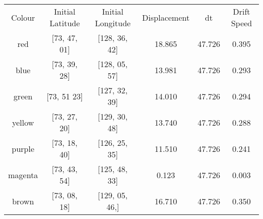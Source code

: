 \begin{tabular}{c|c c c c c}
    Colour & Initial Latitude & Initial Longitude &Displacement & dt & Drift Speed \\
    red & [73, 47, 01] & [128, 36, 42] & 18.865 & 47.726 & 0.395 \\
    blue & [73, 39, 28] & [128, 05, 57] & 13.981 & 47.726 & 0.293 \\
    green & [73, 51 23] & [127, 32, 39] & 14.010 & 47.726 & 0.294 \\
    yellow & [73, 27, 20] & [129, 30, 48] & 13.740 & 47.726 & 0.288 \\
    purple & [73, 18, 40] & [126, 25, 35] & 11.510 & 47.726 & 0.241 \\
    magenta & [73, 43, 54] & [125, 48, 33] & 0.123 & 47.726 & 0.003 \\
    brown & [73, 08, 18] & [129, 05, 46,] & 16.710 & 47.726 & 0.350  
\end{tabular}